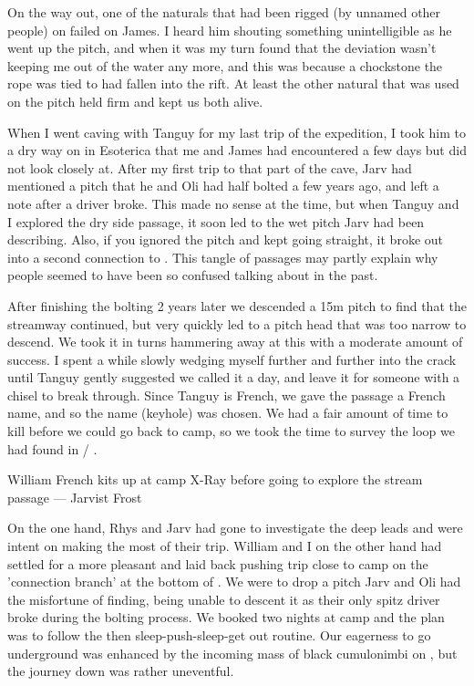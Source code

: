 On the way out, one of the naturals that had been rigged (by unnamed other people) on  failed on James. I heard him shouting something unintelligible as he went up the pitch, and when it was my turn found that the deviation wasn't keeping me out of the water any more, and this was because a chockstone the rope was tied to had fallen into the rift. At least the other natural that was used on the pitch held firm and kept us both alive.


When I went caving with Tanguy for my last trip of the expedition, I took him to a dry way on in Esoterica that me and James had encountered a few days but did not look closely at. After my first trip to that part of the cave, Jarv had mentioned a pitch that he and Oli had half bolted a few years ago, and left a note after a driver broke. This made no sense at the time, but when Tanguy and I explored the dry side passage, it soon led to the wet pitch Jarv had been describing. Also, if you ignored the pitch and kept going straight, it broke out into a second connection to . This tangle of passages may partly explain why people seemed to have been so confused talking about  in the past. 

After finishing the bolting 2 years later we descended a 15m pitch to find that the streamway continued, but very quickly led to a pitch head that was too narrow to descend. We took it in turns hammering away at this with a moderate amount of success. I spent a while slowly wedging myself further and further into the crack until Tanguy gently suggested we called it a day, and leave it for someone with a chisel to break through. Since Tanguy is French, we gave the passage a French name, and so the name  (keyhole) was chosen. We had a fair amount of time to kill before we could go back to camp, so we took the time to survey the loop we had found in  / .

\begin{marginfigure}
\centering
{}
\label{Will at camp}
\caption{William French kits up at camp X-Ray before going to explore the  stream passage --- Jarvist Frost}
\end{marginfigure}

On the one hand, Rhys and Jarv had gone to investigate the deep leads and were intent on making the most of their trip. William and I on the other hand had settled for a more pleasant and laid back pushing trip close to camp on the 'connection branch' at the bottom of . We were to drop a pitch Jarv and Oli had the misfortune of finding, being unable to descent it as their only spitz driver broke during the bolting process. We booked two nights at camp  and the plan was to follow the then sleep-push-sleep-get out routine. Our eagerness to go underground was enhanced by the incoming mass of black cumulonimbi on , but the journey down was rather uneventful.

